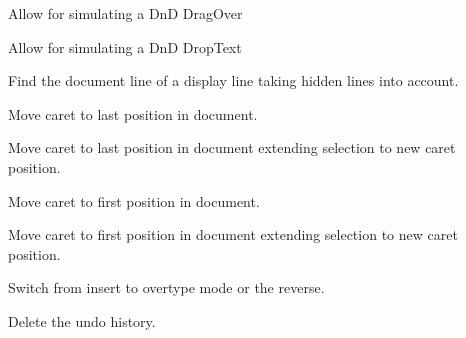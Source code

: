 Allow for simulating a DnD DragOver


\label{wxstyledtextctrldodroptext}


Allow for simulating a DnD DropText


\label{wxstyledtextctrldoclinefromvisible}


Find the document line of a display line taking hidden lines into account.


\label{wxstyledtextctrldocumentend}


Move caret to last position in document.


\label{wxstyledtextctrldocumentendextend}


Move caret to last position in document extending selection to new caret position.


\label{wxstyledtextctrldocumentstart}


Move caret to first position in document.


\label{wxstyledtextctrldocumentstartextend}


Move caret to first position in document extending selection to new caret position.


\label{wxstyledtextctrledittoggleovertype}


Switch from insert to overtype mode or the reverse.


\label{wxstyledtextctrlemptyundobuffer}


Delete the undo history.


\label{wxstyledtextctrlendundoaction}

